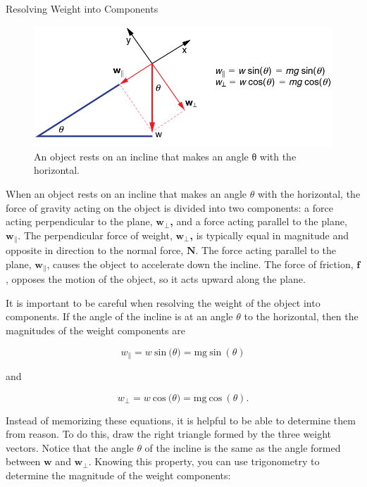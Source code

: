 \documentclass[
]{book}
\begin{document}
\hypertarget{fs-id2658609}{}
Resolving Weight into Components

{\hfill\break
}

\begin{figure}
\hypertarget{import-auto-id1795220}{%
\centering
\includegraphics{images/Figure_04_05_03.jpg}
\caption{An object rests on an incline that makes an angle θ with the
horizontal.}\label{import-auto-id1795220}
}
\end{figure}

When an object rests on an incline that makes an angle \(\theta{}\) with
the horizontal, the force of gravity acting on the object is divided
into two components: a force acting perpendicular to the plane,
\(\textbf{w}_{\bot}{}\)\textbf{,} and a force
acting parallel to the plane, \(\textbf{w}_{\parallel}{}\). The
perpendicular force of weight,
\(\textbf{w}_{\bot}{}\)\textbf{,} is typically
equal in magnitude and opposite in direction to the normal force,
\(\textbf{N}{}\). The force acting parallel to the plane,
\(\textbf{w}_{\parallel}{}\), causes the object to accelerate down the
incline. The force of friction, \(\mathbf{f}{}\), opposes the motion of
the object, so it acts upward along the plane.

It is important to be careful when resolving the weight of the object
into components. If the angle of the incline is at an angle \(\theta{}\)
to the horizontal, then the magnitudes of the weight components are

\leavevmode{}%
\[{{w_{\parallel} = w\ }\text{sin}\ (\theta{) = {\text{mg}\ }}\text{sin}\ (\theta)}{}\]

and

\leavevmode{}%
\[{{w_{\bot} = w\ }\text{cos}\ (\theta{) = \text{mg}\ }\text{cos}\ (\theta)}.\]

Instead of memorizing these equations, it is helpful to be able to
determine them from reason. To do this, draw the right triangle formed
by the three weight vectors. Notice that the angle \(\theta{}\) of the
incline is the same as the angle formed between
\(\textbf{w}{}\)\textbf{} and
\(\textbf{w}_{\bot}{}\)\textbf{}. Knowing this
property, you can use trigonometry to determine the magnitude of the
weight components:
\end{document}
